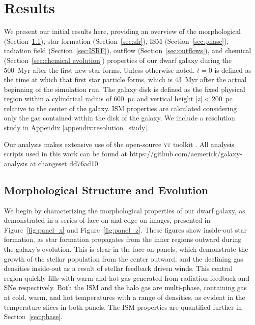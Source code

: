 \documentclass[fleqn,usenatbib,useAMS]{mnras}
\begin{document}
\section{Results}
\label{sec:results}
We present our initial results here, providing an overview of the morphological (Section~\ref{sec:structure}), star formation (Section~\ref{sec:sfr}), ISM (Section~\ref{sec:phase}), radiation field (Section~\ref{sec:ISRF}), outflow (Section~\ref{sec:outflows}), and chemical (Section~\ref{sec:chemical evolution}) properties of our dwarf galaxy during the 500~Myr after the first new star forms. Unless otherwise noted, $t = 0$ is defined as the time at which that first star particle forms, which is 43~Myr after the actual beginning of the simulation run. The galaxy disk is defined as the fixed physical region within a cylindrical radius of 600~pc and vertical height $|z| < 200$~pc relative to the center of the galaxy. ISM properties are calculated considering only the gas contained within the disk of the galaxy. We include a resolution study in Appendix \ref{appendix:resolution_study}.

Our analysis makes extensive use of the open-source \textsc{yt} toolkit \citep{yt}. All analysis scripts used in this work can be found at https://github.com/aemerick/galaxy-analysis at changeset dd76ad10.

\subsection{Morphological Structure and Evolution}
\label{sec:structure}

We begin by characterizing the morphological properties of our dwarf galaxy, as demonstrated in a series of face-on and edge-on images, presented in Figure~\ref{fig:panel_x} and Figure~\ref{fig:panel_z}. These figures show inside-out star formation, as star formation propagates from the inner regions outward during the galaxy's evolution. This is clear in the face-on panels, which demonstrate the growth of the stellar population from the center outward, and the declining gas densities inside-out as a result of stellar feedback driven winds. This central region quickly fills with warm and hot gas generated from radiation feedback and SNe respectively. Both the ISM and the halo gas are multi-phase, containing gas at cold, warm, and hot temperatures with a range of densities, as evident in the temperature slices in both panels. The ISM properties are quantified further in Section~\ref{sec:phase}.
\end{document}
